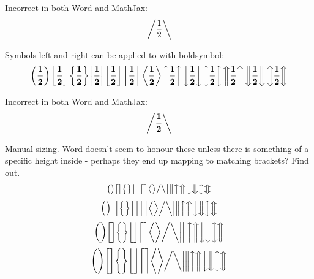 \documentclass[12pt,a4paper]{article}
\theoremstyle{clearprint}
\begin{document}
Incorrect in both Word and MathJax:
\begin{equation}
\left/ \frac{1}{2} \right\backslash 
\end{equation}

\noindent 
Symbols left and right can be applied to with boldsymbol:
\begin{equation}
\boldsymbol{\left( \frac{1}{2} \right) \left[ \frac{1}{2} \right] \left\{ \frac{1}{2} \right\} \left| \frac{1}{2} \right| \left\lfloor \frac{1}{2} \right\rfloor \left\lceil \frac{1}{2} \right\rceil \left\langle \frac{1}{2} \right\rangle \left\uparrow \frac{1}{2} \right\uparrow \left\downarrow \frac{1}{2} \right\downarrow \left\updownarrow \frac{1}{2} \right\updownarrow \left\Uparrow \frac{1}{2} \right\Uparrow \left\Downarrow \frac{1}{2} \right\Downarrow \left\Updownarrow \frac{1}{2} \right\Updownarrow }  
\end{equation}

Incorrect in both Word and MathJax:
\begin{equation}
\boldsymbol{\left/ \frac{1}{2} \right\backslash} 
\end{equation}

Manual sizing. Word doesn't seem to honour these unless there is something of a specific height inside - perhaps they end up mapping to matching brackets? Find out.
\begin{equation}
\big( \big) \big[ \big] \big\{ \big\} \big\lfloor \big\rfloor \big\lceil \big\rceil \big\langle \big\rangle 
\big/ \big\backslash \big| \big\| \big\uparrow \big\Uparrow \big\downarrow \big\Downarrow \big\updownarrow \big\Updownarrow
\end{equation}
\begin{equation}
\Big( \Big) \Big[ \Big] \Big\{ \Big\} \Big\lfloor \Big\rfloor \Big\lceil \Big\rceil \Big\langle \Big\rangle 
\Big/ \Big\backslash \Big| \Big\| \Big\uparrow \Big\Uparrow \Big\downarrow \Big\Downarrow \Big\updownarrow \Big\Updownarrow
\end{equation}
\begin{equation}
\bigg( \bigg) \bigg[ \bigg] \bigg\{ \bigg\} \bigg\lfloor \bigg\rfloor \bigg\lceil \bigg\rceil \bigg\langle \bigg\rangle 
\bigg/ \bigg\backslash \bigg| \bigg\| \bigg\uparrow \bigg\Uparrow \bigg\downarrow \bigg\Downarrow \bigg\updownarrow \bigg\Updownarrow
\end{equation}
\begin{equation}
\Bigg( \Bigg) \Bigg[ \Bigg] \Bigg\{ \Bigg\} \Bigg\lfloor \Bigg\rfloor \Bigg\lceil \Bigg\rceil \Bigg\langle \Bigg\rangle 
\bigg/ \bigg\backslash \bigg| \bigg\| \bigg\uparrow \bigg\Uparrow \bigg\downarrow \bigg\Downarrow \bigg\updownarrow \bigg\Updownarrow
\end{equation}
\end{document}
